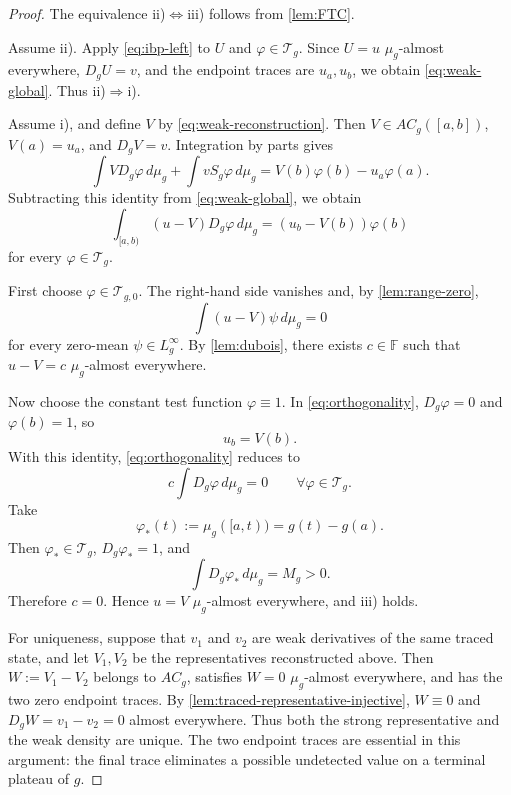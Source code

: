 \documentclass[preprint,12pt]{elsarticle}
\newcommand{\rev}[1]{{\color{red}#1}}
\newenvironment{revision}{\begingroup\color{red}}{\endgroup}
\newcommand{\rev}[1]{#1}
\newenvironment{revision}{}{}
\theoremstyle{definition}
\theoremstyle{remark}
\newcommand{\F}{\mathbb F}
\newcommand{\mug}{\mu_g}
\newcommand{\ACg}{AC_g}
\begin{document}
\begin{proof}
The equivalence ii)$\Leftrightarrow$iii) follows from \cref{lem:FTC}.

Assume ii). Apply \eqref{eq:ibp-left} to $U$ and $\varphi\in\mathcal T_g$. Since $U=u$ $\mug$-almost everywhere, $D_gU=v$, and the endpoint traces are $u_a,u_b$, we obtain \eqref{eq:weak-global}. Thus ii)$\Rightarrow$i).

Assume i), and define $V$ by \eqref{eq:weak-reconstruction}. Then
\rev{$V\in\ACg([a,b])$}, $V(a)=u_a$, and $D_gV=v$. Integration by parts gives
\[
 \int VD_g\varphi\,d\mug+\int vS_g\varphi\,d\mug
 =V(b)\varphi(b)-u_a\varphi(a).
\]
Subtracting this identity from \eqref{eq:weak-global}, we obtain
\begin{equation}\label{eq:orthogonality}
 \int_{[a,b)}(u-V)D_g\varphi\,d\mug
 =(u_b-V(b))\varphi(b)
\end{equation}
for every $\varphi\in\mathcal T_g$.

First choose $\varphi\in\mathcal T_{g,0}$. The right-hand side vanishes and, by \cref{lem:range-zero},
\[
 \int (u-V)\psi\,d\mug=0
\]
for every zero-mean $\psi\in L_g^\infty$. By \cref{lem:dubois}, there exists $c\in\F$ such that $u-V=c$ $\mug$-almost everywhere.

Now choose the constant test function $\varphi\equiv1$. In \eqref{eq:orthogonality}, $D_g\varphi=0$ and $\varphi(b)=1$, so
\[
 u_b=V(b).
\]
With this identity, \eqref{eq:orthogonality} reduces to
\[
 c\int D_g\varphi\,d\mug=0
\qquad\forall\varphi\in\mathcal T_g.
\]
Take
\[
 \varphi_*(t):=\mug([a,t))=g(t)-g(a).
\]
Then $\varphi_*\in\mathcal T_g$, $D_g\varphi_*=1$, and
\[
 \int D_g\varphi_*\,d\mug=M_g>0.
\]
Therefore $c=0$. Hence $u=V$ $\mug$-almost everywhere, and iii) holds.

\begin{revision}
For uniqueness, suppose that \(v_1\) and \(v_2\) are weak derivatives of the
same traced state, and let \(V_1,V_2\) be the representatives reconstructed
above.  Then \(W:=V_1-V_2\) belongs to \(AC_g\), satisfies
\(W=0\) \(\mu_g\)-almost everywhere, and has the two zero endpoint traces.
By \cref{lem:traced-representative-injective}, \(W\equiv0\) and
\(D_gW=v_1-v_2=0\) almost everywhere.  Thus both the strong representative and
the weak density are unique.  The two endpoint traces are essential in this
argument: the final trace eliminates a possible undetected value on a terminal
plateau of \(g\).
\end{revision}
\end{proof}
\end{document}
